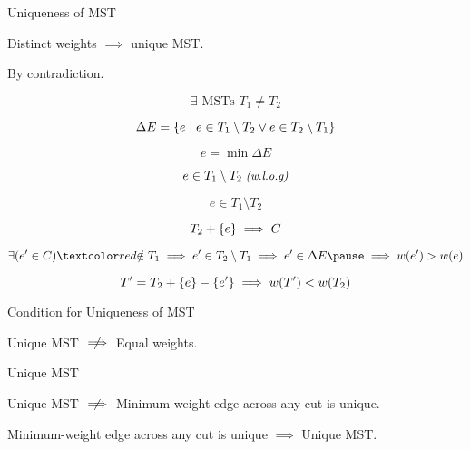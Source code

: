 
\begin{frame}{}
  \begin{exampleblock}{Uniqueness of MST }
    \centerline{Distinct weights $\implies$ unique MST.}
  \end{exampleblock}

  \pause
  \vspace{0.50cm}
  \centerline{By contradiction.}

  \pause
  \[
    \exists \text{ MSTs } T_1 \neq T_2
  \]

  \pause
  \[
    \Delta E = \{e \mid e \in T_1 \setminus T_2 \lor e \in T_2 \setminus T_1\}
  \]

  \pause
  \[
    e = \min \Delta E
  \]

  \pause
  \[
    e \in T_1 \setminus T_2 \;\text{\small \it (w.l.o.g)}
  \]
\end{frame}

\begin{frame}{}
  \[
    e \in T_1 \setminus T_2
  \]


  \pause
  \vspace{-0.30cm}
  \[
    T_2 + \{e\} \implies C
  \]

  \pause
  \vspace{-0.30cm}
  \[
    \exists (e' \in C) \red{\notin T_1} \implies e' \in T_{2} \setminus T_{1} \implies e' \in \Delta E \pause \implies w(e') > w(e)
  \]

  \pause
  \vspace{-0.50cm}
  \[
    T' = T_{2} + \{e\} - \{e'\} \implies w(T') < w(T_{2})
  \]
\end{frame}

\begin{frame}{}
  \begin{exampleblock}{Condition for Uniqueness of MST }
    \centerline{Unique MST $\centernot\implies$ Equal weights.}
  \end{exampleblock}

  \pause
\end{frame}

\begin{frame}{}
  \begin{exampleblock}{Unique MST }
    \centerline{Unique MST $\centernot\implies$ Minimum-weight edge across any cut is unique.}
  \end{exampleblock}

  \pause

  \pause
  \begin{theorem}
    Minimum-weight edge across any cut is unique $\implies$ Unique MST.
  \end{theorem}
\end{frame}


